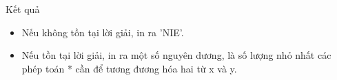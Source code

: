 Kết quả
\begin{itemize}
	\item     Nếu không tồn tại lời giải, in ra 'NIE'.   
	\item     Nếu tồn tại lời giải, in ra một số nguyên dương, là số lượng nhỏ nhất các phép toán * cần để tương đương hóa hai từ x và y.   
\end{itemize}